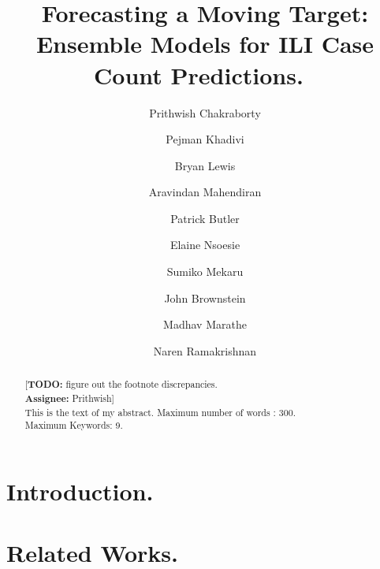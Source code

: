 \documentclass[twoside,leqno,twocolumn]{article}
\newcommand{\TODO}[2][NA]{{\color{red}[\textbf{TODO:} #2 \\ \textbf{Assignee:} #1]}}
\begin{document}

\title{\Large Forecasting a Moving Target: Ensemble Models for ILI Case
Count Predictions.~\footnotemark[4]}
  \author{Prithwish Chakraborty \footnotemark[1] \\ \and
    Pejman Khadivi \footnotemark[1] \\ \and
  Bryan Lewis \footnotemark[2] \\ \and
    Aravindan Mahendiran \footnotemark[1] \\ \and 
    Patrick Butler \footnotemark[1] \\ \and 
    Elaine Nsoesie \footnotemark[3] \\ \and
    Sumiko Mekaru \footnotemark[3] \\ \and
      John Brownstein \footnotemark[3] \\ \and
    Madhav Marathe \footnotemark[2] \\ \and
    Naren Ramakrishnan \footnotemark[1]
  }
\date{}

\maketitle


 
\begin{abstract}
  \TODO[Prithwish]{figure out the footnote discrepancies.}\\
  \small\baselineskip=9pt
  This is the text of my  abstract.
  Maximum number of words : 300.\\
  Maximum Keywords: 9.\\
\end{abstract}
 
\section{Introduction.}


\section{Related Works.}

\end{document}
